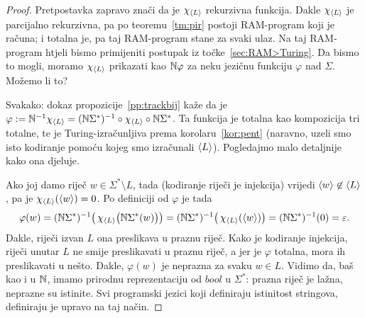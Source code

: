 \begin{proof}
Pretpostavka zapravo znači da je $\chi_{\langle L\rangle}$ rekurzivna funkcija. Dakle $\chi_{\langle L\rangle}$ je parcijalno rekurzivna, pa po teoremu~\ref{tm:pir} postoji RAM-program koji je računa; i totalna je, pa taj RAM-program stane za svaki ulaz. Na taj RAM-program htjeli bismo primijeniti postupak iz točke~\ref{sec:RAM>Turing}. Da bismo to mogli, moramo $\chi_{\langle L\rangle}$ prikazati kao ${\mathbb N}\varphi$ za neku jezičnu funkciju $\varphi$ nad $\Sigma$. Možemo li to?

Svakako: dokaz propozicije~\ref{pp:trackbij} kaže da je $\varphi:={\mathbb N}^{-1}\chi_{\langle L\rangle}=({\mathbb N}\Sigma^*)^{-1}\circ\chi_{\langle L\rangle}\circ{\mathbb N}\Sigma^*$. Ta funkcija je totalna kao kompozicija tri totalne, te je Turing-izračunljiva prema korolaru~\ref{kor:pent} (naravno, uzeli smo isto kodiranje pomoću kojeg smo izračunali $\langle L\rangle$). Pogledajmo malo detaljnije kako ona djeluje.

Ako joj damo riječ $w\in\Sigma^*\setminus L$, tada (kodiranje riječi je injekcija) vrijedi $\langle w\rangle\not\in\langle L\rangle$, pa je $\chi_{\langle L\rangle}(\langle w\rangle)=0$. Po definiciji od $\varphi$ je tada
\begin{equation}
    \varphi(w)=({\mathbb N}\Sigma^*)^{-1}\bigl(\,\chi_{\langle L\rangle}\bigl({\mathbb N}\Sigma^*(w)\bigr)\bigr)=({\mathbb N}\Sigma^*)^{-1}\bigl(\,\chi_{\langle L\rangle}(\langle w\rangle)\bigr)=({\mathbb N}\Sigma^*)^{-1}(0)=\varepsilon\text.
\end{equation}
Dakle, riječi izvan $L$ ona preslikava u praznu riječ. Kako je kodiranje injekcija, riječi unutar $L$ ne smije preslikavati u praznu riječ, a jer je $\varphi$ totalna, mora ih preslikavati u nešto. Dakle, $\varphi(w)$ je neprazna za svaku $w\in L$. Vidimo da, baš kao i u ${\mathbb N}$, imamo prirodnu reprezentaciju od $bool$ u $\Sigma^*$: prazna riječ je lažna, neprazne su istinite. Svi programski jezici koji definiraju istinitost stringova, definiraju je upravo na taj način.



\end{proof}
